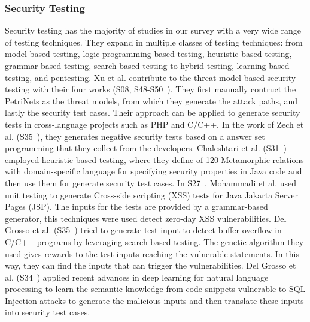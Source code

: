 \subsubsection{Security Testing}
Security testing has the majority of studies in our survey with a very wide range of testing techniques. They expand in multiple classes of testing techniques: from model-based testing, logic programming-based testing, heuristic-based testing, grammar-based testing, search-based testing to hybrid testing, learning-based testing, and pentesting. Xu et al. contribute to the threat model based security testing with their four works (S08, S48-S50~\cite{marback2013threat, xu2011tool, xu2012automated, Xu2015247}). They first manually contruct the PetriNets as the threat models, from which they generate the attack paths, and lastly the security test cases. Their approach can be applied to generate security tests in cross-language projects such as PHP and C/C++.
In the work of Zech et al. (S35~\cite{Zech201488}), they generates negative security tests based on a answer set programming that they collect from the developers. Chaleshtari et al. (S31~\cite{Chaleshtari20233430}) employed heuristic-based testing, where they define of 120 Metamorphic relations with domain-specific language for specifying security properties in Java code and then use them for generate security test cases. In S27~\cite{Mohammadi201678}, Mohammadi et al. used unit testing to generate Cross-side scripting (XSS) tests for Java Jakarta Server Pages (JSP). The inputs for the tests are provided by a grammar-based generator, this techniques were used detect zero-day XSS vulnerabilities. Del Grosso et al. (S35~\cite{DelGrosso20083125}) tried to generate test input to detect buffer overflow in C/C++ programs by leveraging search-based testing. The genetic algorithm they used gives rewards to the test inputs reaching the vulnerable statements. In this way, they can find the inputs that can trigger the vulnerabilities. Del Grosso et al. (S34~\cite{Liu2020286}) applied recent advances in deep learning for natural language processing to learn the semantic knowledge from code snippets vulnerable to SQL Injection attacks to generate the malicious inputs and then translate these inputs into security test cases.


